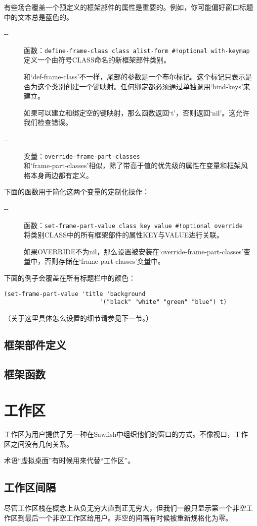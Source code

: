 \documentclass{book}
\begin{document}
\begin{CJK*}{UTF8}{gbsn}
有些场合覆盖一个预定义的框架部件的属性是重要的。例如，你可能偏好窗口标题中的文本总是蓝色的。
\begin{description}
\item[-{}-] 函数：\verb|define-frame-class class alist-form #!optional with-keymap|\\
定义一个由符号CLASS命名的新框架部件类别。

和`def-frame-class'不一样，尾部的参数是一个布尔标记。这个标记只表示是否为这个类别创建一个键映射。任何绑定都必须通过单独调用`bind-keys'来建立。

如果可以建立和绑定空的键映射，那么函数返回`t'，否则返回`nil'。这允许我们检查错误。
\item[-{}-] 变量：\verb|override-frame-part-classes|\\
和`frame-part-classes'相似，除了带高于值的优先级的属性在变量和框架风格本身两边都有定义。
\end{description}

下面的函数用于简化这两个变量的定制化操作：
\begin{description}
\item[-{}-] 函数：\verb|set-frame-part-value class key value #!optional override|\\
将类别CLASS中的所有框架部件的属性KEY与VALUE进行关联。

如果OVERRIDE不为nil，那么设置被安装在`override-frame-part-classes'变量中，否则存储在`frame-part-classes'变量中。
\end{description}

下面的例子会覆盖在所有标题栏中的颜色：
\begin{verbatim}
(set-frame-part-value 'title 'background
                           '("black" "white" "green" "blue") t)
\end{verbatim}
（关于这里具体怎么设置的细节请参见下一节。）
\section{框架部件定义}
\section{框架函数}
\chapter{工作区}
工作区为用户提供了另一种在Sawfish中组织他们的窗口的方式。不像视口，工作区之间没有几何关系。

术语``虚拟桌面''有时候用来代替``工作区''。
\section{工作区间隔}
尽管工作区栈在概念上从负无穷大直到正无穷大，但我们一般只显示第一个非空工作区到最后一个非空工作区给用户。非空的间隔有时候被重新规格化为零。


\end{CJK*}
\end{document}
